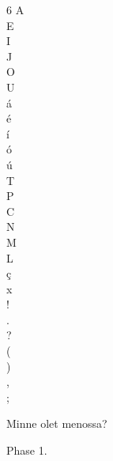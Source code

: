 \documentclass{article}
\begin{document}
\begin{multicols}{6}
A       \Ttelco \TTthreedots \\
E       \Ttelco \TTacute \\
I       \Ttelco \TTdot \\
J       \Ttelco \TTdot \\
O       \Ttelco \TTrightcurl \\
U       \Ttelco \TTleftcurl \\
á       \Taara \TTthreedots \\
é       \Taara \TTacute \\
í       \Taara \TTdot \\
ó       \Taara \TTrightcurl \\
ú       \Taara \TTleftcurl \\
T       \Ttinco \TTdoubler \\
P       \Tparma \TTdoubler \\
C       \Tcalma \TTdoubler \\
N       \Tnuumen \TTdoubler \\
M       \Tmalta \TTdoubler \\
L       \Tlambe \TTdoubler \\
ç       \Tcurlyhook \\
x       \Tcalma \Tlefthook \\
!       \Texclamation \\
.       \Tcolon \\
?       \Tquestion \\
(       \Tparenthesis \\
)       \Tparenthesis \\
,         \Tcentereddot \\
;       \Tcentereddot \\

\end{multicols}

Minne olet menossa? \\
\Tmalta \TTdot \Tnuumen \TTdoubler \TTacute  \Ts \Ttelco \TTrightcurl \Tlambe \TTacute \Ttinco  \Ts \Tmalta \TTacute \Tnuumen \TTrightcurl \Tessenuquerna \TTthreedots \Tquestion

\newpage
{}

Phase 1.

\Tsilmenuquerna \TTacute \TTacute \Tcalma  \Ts \Ttelco \TTthreedots  \Ts \Tsilme \Taha \TTacute \Tlambe \Ttinco \TTacute \Toore  \Ts \Ttelco \TTrightcurl \Tnuumen  \Ts \Tthuule \TTacute  \Ts \Troomen \TTacute \Tando  \Ts \Tparma \TTthreedots \Tthuule \Tcolon
 
\end{document}
